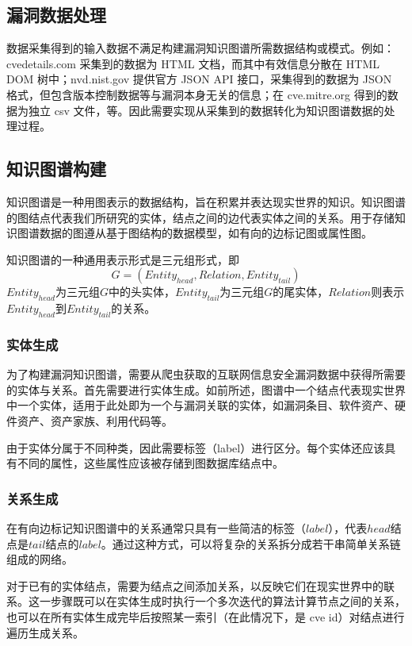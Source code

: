 \documentclass[a4paper,AutoFakeBold,oneside,12pt]{book}
\begin{document}
\subsection{漏洞数据处理}

数据采集得到的输入数据不满足构建漏洞知识图谱所需数据结构或模式。例如：cvedetails.com 采集到的数据为 HTML 文档，而其中有效信息分散在 HTML DOM 树中；nvd.nist.gov 提供官方 JSON API 接口，采集得到的数据为 JSON 格式，但包含版本控制数据等与漏洞本身无关的信息；在 cve.mitre.org 得到的数据为独立 csv 文件，等。因此需要实现从采集到的数据转化为知识图谱数据的处理过程。

\subsection{知识图谱构建}

知识图谱是一种用图表示的数据结构，旨在积累并表达现实世界的知识。知识图谱的图结点代表我们所研究的实体，结点之间的边代表实体之间的关系。用于存储知识图谱数据的图遵从基于图结构的数据模型，如有向的边标记图或属性图。\cite{hogan_knowledge_2022}

知识图谱的一种通用表示形式是三元组形式，即
$$G=(Entity_{head}, Relation, Entity_{tail})$$
$Entity_{head}$为三元组$G$中的头实体，$Entity_{tail}$为三元组$G$的尾实体，$Relation$则表示$Entity_{head}$到$Entity_{tail}$的关系。

\subsubsection{实体生成}

为了构建漏洞知识图谱，需要从爬虫获取的互联网信息安全漏洞数据中获得所需要的实体与关系。首先需要进行实体生成。如前所述，图谱中一个结点代表现实世界中一个实体，适用于此处即为一个与漏洞关联的实体，如漏洞条目、软件资产、硬件资产、资产家族、利用代码等。

由于实体分属于不同种类，因此需要标签（label）进行区分。每个实体还应该具有不同的属性，这些属性应该被存储到图数据库结点中。

\subsubsection{关系生成}

在有向边标记知识图谱中的关系通常只具有一些简洁的标签（$label$），代表$head$结点是$tail$结点的$label$。\cite{hogan_knowledge_2022}通过这种方式，可以将复杂的关系拆分成若干串简单关系链组成的网络。

对于已有的实体结点，需要为结点之间添加关系，以反映它们在现实世界中的联系。这一步骤既可以在实体生成时执行一个多次迭代的算法计算节点之间的关系，也可以在所有实体生成完毕后按照某一索引（在此情况下，是 cve id）对结点进行遍历生成关系。
\end{document}
